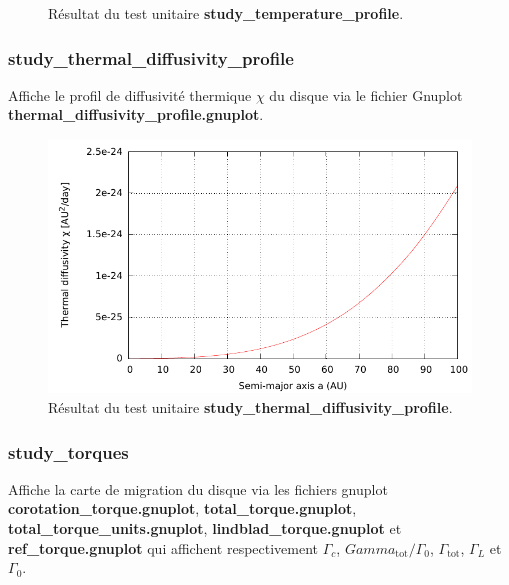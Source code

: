 \begin{figure}[htbp]
\centering
{}\hfill
{}
\caption{Résultat du test unitaire \textbf{study\_temperature\_profile}.}
\end{figure}

\subsubsection{study\_thermal\_diffusivity\_profile}
Affiche le profil de diffusivité thermique $\chi$ du disque via le fichier Gnuplot \textbf{thermal\_diffusivity\_profile.gnuplot}.

\begin{figure}[htbp]
\centering
\includegraphics[width=0.65\linewidth]{figure/unitary_tests/thermal_diffusivity_profile.pdf}
\caption{Résultat du test unitaire \textbf{study\_thermal\_diffusivity\_profile}.}
\end{figure}

\subsubsection{study\_torques}
Affiche la carte de migration du disque via les fichiers gnuplot \textbf{corotation\_torque.gnuplot}, \textbf{total\_torque.gnuplot}, \textbf{total\_torque\_units.gnuplot}, \textbf{lindblad\_torque.gnuplot} et \textbf{ref\_torque.gnuplot} qui affichent respectivement $\Gamma_c$, $Gamma_\text{tot}/\Gamma_0$, $\Gamma_\text{tot}$, $\Gamma_L$ et $\Gamma_0$.

